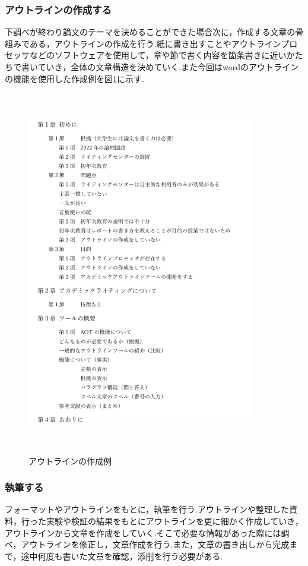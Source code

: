 \documentclass[a4j,12pt]{jarticle}
\begin{document}
\subsubsection{アウトラインの作成する}
下調べが終わり論文のテーマを決めることができた場合次に，作成する文章の骨組みである，アウトラインの作成を行う.紙に書き出すことやアウトラインプロセッサなどのソフトウェアを使用して，章や節で書く内容を箇条書きに近いかたちで書いていき，全体の文章構造を決めていく.また今回はwordのアウトラインの機能を使用した作成例を図\ref{fig:a}に示す.
\begin{figure}[h]
\begin{center}
 \includegraphics[clip,width=100mm,height=160mm]{outline2.png}
\end{center}
 \caption{アウトラインの作成例}
 \label{fig:a}
\end{figure}
\newpage
\subsubsection{執筆する}
フォーマットやアウトラインをもとに，執筆を行う.アウトラインや整理した資料，行った実験や検証の結果をもとにアウトラインを更に細かく作成していき，アウトラインから文章を作成をしていく.そこで必要な情報があった際には調べ，アウトラインを修正し，文章作成を行う.また，文章の書き出しから完成まで，途中何度も書いた文章を確認，添削を行う必要がある.
\newpage
\end{document}
